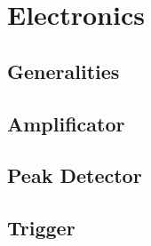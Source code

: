 \chapter{Electronics}

\section{Generalities}

\section{Amplificator}

\section{Peak Detector}

\section{Trigger}